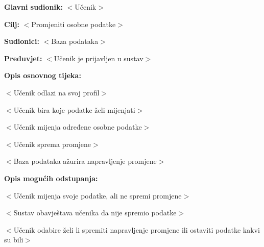 					\noindent {}
					\begin{packed_item}
	
						\item \textbf{Glavni sudionik: }$<$Učenik$>$
						\item  \textbf{Cilj:} $<$Promjeniti osobne podatke$>$
						\item  \textbf{Sudionici:} $<$Baza podataka$>$
						\item  \textbf{Preduvjet:} $<$Učenik je prijavljen u sustav$>$
						\item  \textbf{Opis osnovnog tijeka:}
						
						\item[] \begin{packed_enum}
	
							\item $<$Učenik odlazi na svoj profil$>$
							\item $<$Učenik bira koje podatke želi mijenjati$>$
							\item $<$Učenik mijenja određene osobne podatke$>$
							\item $<$Učenik sprema promjene$>$
							\item $<$Baza podataka ažurira napravljenje promjene$>$
						\end{packed_enum}
						
						\item  \textbf{Opis mogućih odstupanja:}
						
						\item[] \begin{packed_item}
	
							\item[2.a] $<$Učenik mijenja svoje podatke, ali ne spremi promjene$>$
							\item[] \begin{packed_enum}
								
								\item $<$Sustav obavještava učenika da nije spremio podatke$>$
								\item $<$Učenik odabire želi li spremiti napravljenje promjene ili ostaviti podatke kakvi su bili$>$
								
							\end{packed_enum}
							
						\end{packed_item}
					\end{packed_item}

